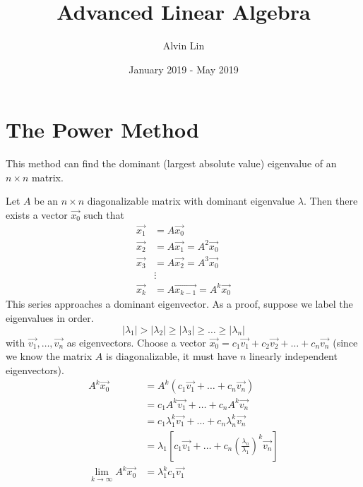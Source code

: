 \documentclass{math}
\title{Advanced Linear Algebra}
\author{Alvin Lin}
\date{January 2019 - May 2019}
\begin{document}
\maketitle

\section*{The Power Method}
This method can find the dominant (largest absolute value) eigenvalue of an
\( n\times n \) matrix. \par
Let \( A \) be an \( n\times n \) diagonalizable matrix with dominant
eigenvalue \( \lambda \). Then there exists a vector \( \vec{x_0} \) such that
\begin{align*}
  \vec{x_1} &= A\vec{x_0} \\
  \vec{x_2} &= A\vec{x_1} = A^2\vec{x_0} \\
  \vec{x_3} &= A\vec{x_2} = A^3\vec{x_0} \\
  &\vdots \\
  \vec{x_k} &= A\overrightarrow{x_{k-1}} = A^k\vec{x_0}
\end{align*}
This series approaches a dominant eigenvector. As a proof, suppose we label
the eigenvalues in order.
\[ |\lambda_1|>|\lambda_2|\ge|\lambda_3|\ge\dots\ge|\lambda_n| \]
with \( \vec{v_1},\dots,\vec{v_n} \) as eigenvectors. Choose a vector
\( \vec{x_0} = c_1\vec{v_1}+c_2\vec{v_2}+\dots+c_n\vec{v_n} \) (since we know
the matrix \( A \) is diagonalizable, it must have \( n \) linearly
independent eigenvectors).
\begin{align*}
  A^k\vec{x_0} &= A^k(c_1\vec{v_1}+\dots+c_n\vec{v_n}) \\
  &= c_1A^k\vec{v_1}+\dots+c_nA^k\vec{v_n} \\
  &= c_1\lambda_1^k\vec{v_1}+\dots+c_n\lambda_n^k\vec{v_n} \\
  &= \lambda_1\left[
    c_1\vec{v_1}+\dots+c_n(\frac{\lambda_n}{\lambda_1})^k\vec{v_n}\right] \\
  \lim_{k\to\infty}A^k\vec{x_0} &= \lambda_1^kc_1\vec{v_1}
\end{align*}
\end{document}
